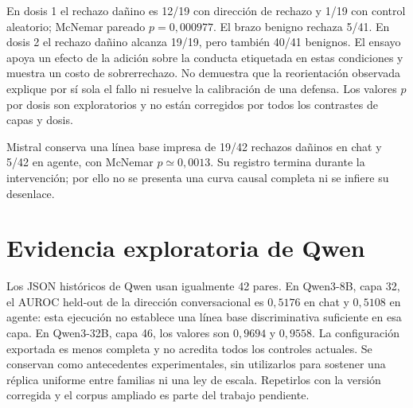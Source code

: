 En dosis 1 el rechazo dañino es 12/19 con dirección de rechazo y 1/19 con control aleatorio; McNemar pareado $p=0{,}000977$. El brazo benigno rechaza 5/41. En dosis 2 el rechazo dañino alcanza 19/19, pero también 40/41 benignos. El ensayo apoya un efecto de la adición sobre la conducta etiquetada en estas condiciones y muestra un costo de sobrerrechazo. No demuestra que la reorientación observada explique por sí sola el fallo ni resuelve la calibración de una defensa. Los valores $p$ por dosis son exploratorios y no están corregidos por todos los contrastes de capas y dosis.

Mistral conserva una línea base impresa de 19/42 rechazos dañinos en chat y 5/42 en agente, con McNemar $p\simeq0{,}0013$. Su registro termina durante la intervención; por ello no se presenta una curva causal completa ni se infiere su desenlace.

\section{Evidencia exploratoria de Qwen}

Los JSON históricos de Qwen usan igualmente 42 pares. En Qwen3-8B, capa 32, el AUROC held-out de la dirección conversacional es $0{,}5176$ en chat y $0{,}5108$ en agente: esta ejecución no establece una línea base discriminativa suficiente en esa capa. En Qwen3-32B, capa 46, los valores son $0{,}9694$ y $0{,}9558$. La configuración exportada es menos completa y no acredita todos los controles actuales. Se conservan como antecedentes experimentales, sin utilizarlos para sostener una réplica uniforme entre familias ni una ley de escala. Repetirlos con la versión corregida y el corpus ampliado es parte del trabajo pendiente.
